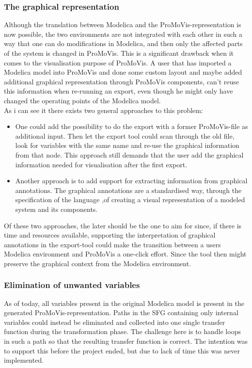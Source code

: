 \subsubsection{The graphical representation}
Although the translation between Modelica and the ProMoVis-representation is now possible, the two environments are not integrated with each other in such a way that one can do modifications in Modelica, and then only the affected parts of the system is changed in ProMoVis. This is a significant drawback when it comes to the visualisation purpose of ProMoVis. A user that has imported a Modelica model into ProMoVis and done some custom layout and maybe added additional graphical representation through ProMoVis components, can't reuse this information when re-running an export, even though he might only have changed the operating points of the Modelica model.\\\newline As i can see it there exists two general approaches to this problem: 
\begin{itemize}
\item One could add the possibility to do the export with a former ProMoVis-file as additional input. Then let the export tool could scan through the old file, look for variables with the same name and re-use the graphical information from that node. This approach still demands that the user add the graphical information needed for visualisation after the first export.
\item Another approach is to add support for extracting information from graphical annotations. The graphical annotations are a standardised way, through the specification of the language \cite{ModelicaSpec}\nocite{*},of creating a visual representation of a modeled system and its components.
\end{itemize}Of these two approaches, the later should be the one to aim for since, if there is time and resources available, supporting the interpretation of graphical annotations in the export-tool could make the transition between a users Modelica environment and ProMoVis a one-click effort. Since the tool then might preserve the graphical context from the Modelica environment.
\subsubsection{Elimination of unwanted variables}
As of today, all variables present in the original Modelica model is present in the generated ProMoVis-representation. Paths in the SFG containing only internal variables could instead be eliminated and collected into one single transfer function during the transformation phase. The challenge here is to handle loops in such a path so that the resulting transfer function is correct. The intention was to support this before the project ended, but due to lack of time this was never implemented. 